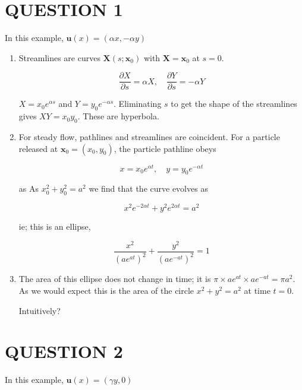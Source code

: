 \documentclass[a4paper]{article}
\begin{document}
	
\maketitle

\section{QUESTION 1}

In this example, $ \mathbf{u}(x) =  (\alpha x,- \alpha y) $

\begin{enumerate}
	\item Streamlines are curves $ \mathbf{X}(s; \mathbf{x}_{0}) $ with $ \mathbf{X} = \mathbf{x}_{0} $ at $ s = 0 $. 
	
	\[ \frac{\partial X }{\partial s} = \alpha X, \quad \frac{\partial Y }{\partial s} = - \alpha Y \]
	
	$ X = x_{0} e^{\alpha s} $ and $ Y = y_{0}e^{- \alpha s} $. Eliminating $ s $ to get the shape of the streamlines gives $ XY = x_{0}y_{0} $. These are hyperbola.
	
	\item For steady flow, pathlines and streamlines are coincident. For a particle released at $ \mathbf{x}_{0} = (x_{0},y_{0}) $, the particle pathline obeys
	
	\[ x = x_{0} e^{\alpha t}, \quad y = y_{0}e^{- \alpha t} \]
	
	as  As $ x_{0}^{2} + y_{0}^{2} = a^{2} $ we find that the curve evolves as
	
	\[ x^{2}e^{-2\alpha t} + y^{2}e^{2 \alpha t} = a^{2} \]
	
	ie; this is an ellipse,
	
	
	\[ \frac{x^{2}}{(ae^{at})^{2}} + \frac{y^{2}}{(ae^{-at})^{2}} = 1 \]
	
	\item 
	
	The area of this ellipse does not change in time; it is $ \pi \times ae^{at} \times ae^{-at} = \pi a^{2} $. As we would expect this is the area of the circle $ x^{2} + y^{2} = a^{2} $ at time $ t = 0 $. 
	
	Intuitively?
	
	
\end{enumerate}


\section{QUESTION 2}

In this example, $ \mathbf{u}(x) = (\gamma y, 0) $
\end{document}
